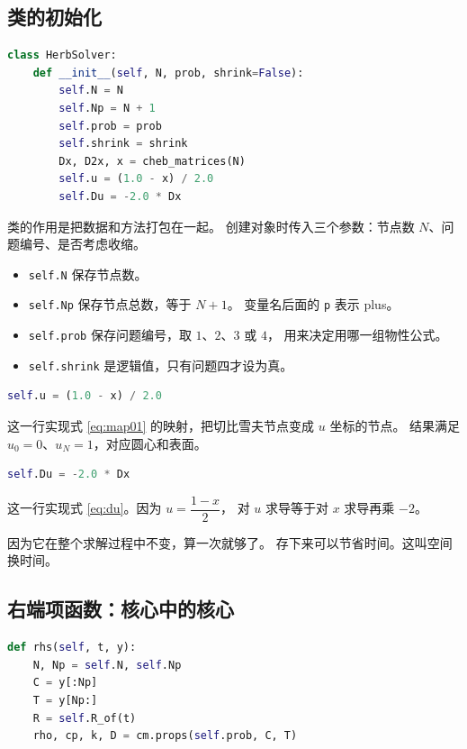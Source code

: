 \subsection{类的初始化}

\begin{lstlisting}[language=Python]
class HerbSolver:
    def __init__(self, N, prob, shrink=False):
        self.N = N
        self.Np = N + 1
        self.prob = prob
        self.shrink = shrink
        Dx, D2x, x = cheb_matrices(N)
        self.u = (1.0 - x) / 2.0
        self.Du = -2.0 * Dx
\end{lstlisting}

类的作用是把数据和方法打包在一起。
创建对象时传入三个参数：节点数 $N$、问题编号、是否考虑收缩。

\begin{itemize}[leftmargin=1.8em,itemsep=2pt]
\item \texttt{self.N} 保存节点数。
\item \texttt{self.Np} 保存节点总数，等于 $N+1$。
  变量名后面的 \texttt{p} 表示 plus。
\item \texttt{self.prob} 保存问题编号，取 $1$、$2$、$3$ 或 $4$，
  用来决定用哪一组物性公式。
\item \texttt{self.shrink} 是逻辑值，只有问题四才设为真。
\end{itemize}

\begin{lstlisting}[language=Python]
self.u = (1.0 - x) / 2.0
\end{lstlisting}

这一行实现式 \eqref{eq:map01} 的映射，把切比雪夫节点变成 $u$ 坐标的节点。
结果满足 $u_0=0$、$u_N=1$，对应圆心和表面。

\begin{lstlisting}[language=Python]
self.Du = -2.0 * Dx
\end{lstlisting}

这一行实现式 \eqref{eq:du}。因为 $u=\dfrac{1-x}{2}$，
对 $u$ 求导等于对 $x$ 求导再乘 $-2$。

因为它在整个求解过程中不变，算一次就够了。
存下来可以节省时间。这叫空间换时间。

\subsection{右端项函数：核心中的核心}

\begin{lstlisting}[language=Python]
def rhs(self, t, y):
    N, Np = self.N, self.Np
    C = y[:Np]
    T = y[Np:]
    R = self.R_of(t)
    rho, cp, k, D = cm.props(self.prob, C, T)
\end{lstlisting}

